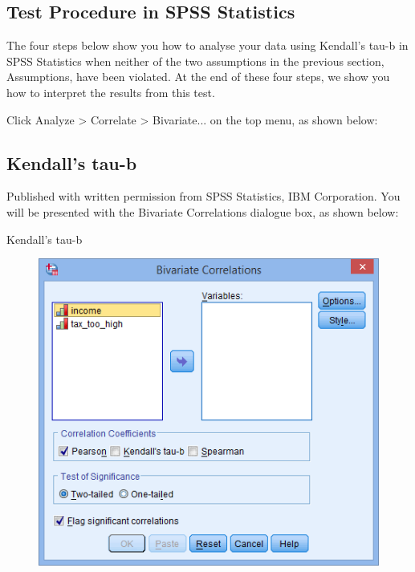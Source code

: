 \documentclass[]{article}
\begin{document}
\subsection{Test Procedure in SPSS Statistics}
The four steps below show you how to analyse your data using Kendall's tau-b in SPSS Statistics when neither of the two assumptions in the previous section, Assumptions, have been violated. At the end of these four steps, we show you how to interpret the results from this test.

Click Analyze > Correlate > Bivariate... on the top menu, as shown below:

\subsection{Kendall's tau-b}
Published with written permission from SPSS Statistics, IBM Corporation.
You will be presented with the Bivariate Correlations dialogue box, as shown below:

Kendall's tau-b
\begin{figure}
\centering
\includegraphics[width=0.7\linewidth]{images/options-kendalls-tau-b}
\caption{}
\label{fig:options-kendalls-tau-b}
\end{figure}
\end{document}
